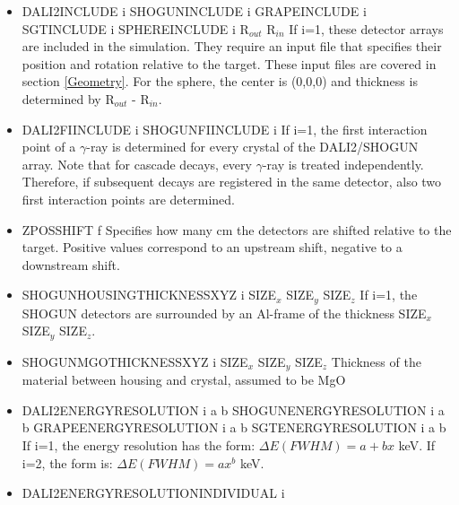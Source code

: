 \documentclass[12pt]{book}
\begin{document}
\begin{itemize}
\item DALI2INCLUDE i\hfill{} \linebreak
  SHOGUNINCLUDE i\hfill{} \linebreak
  GRAPEINCLUDE i\hfill{} \linebreak
  SGTINCLUDE i\hfill{} \linebreak
  SPHEREINCLUDE i R$_{out}$ R$_{in}$ \hfill{} \linebreak
  If i=1, these detector arrays are included in the simulation. They require an input file that 
  specifies their position and rotation relative to the target. These input files are covered in section
  \ref{Geometry}. For the sphere, the center is (0,0,0) and thickness is determined by R$_{out}$ - R$_{in}$. 
\item DALI2FIINCLUDE i\hfill{} \linebreak
  SHOGUNFIINCLUDE i\hfill{} \linebreak
  If i=1, the first interaction point of a $\gamma$-ray is determined for every crystal of the DALI2/SHOGUN array. Note that for
  cascade decays, every $\gamma$-ray is treated independently. Therefore, if subsequent decays are 
  registered in the same detector, also two first interaction points are determined.
\item ZPOSSHIFT f\hfill{} \linebreak
  Specifies how many cm the detectors are shifted relative to the target. Positive values correspond to an upstream
  shift, negative to a downstream shift.
\item SHOGUNHOUSINGTHICKNESSXYZ i SIZE$_{x}$ SIZE$_{y}$ SIZE$_{z}$\hfill{} \linebreak
  If i=1, the SHOGUN detectors are surrounded by an Al-frame of the thickness SIZE$_{x}$ SIZE$_{y}$ SIZE$_{z}$. 
\item SHOGUNMGOTHICKNESSXYZ i SIZE$_{x}$ SIZE$_{y}$ SIZE$_{z}$\hfill{} \linebreak
  Thickness of the material between housing and crystal, assumed to be MgO
\item DALI2ENERGYRESOLUTION i a b\hfill{} \linebreak
  SHOGUNENERGYRESOLUTION i a b\hfill{} \linebreak
  GRAPEENERGYRESOLUTION i a b\hfill{} \linebreak
  SGTENERGYRESOLUTION i a b\hfill{} \linebreak
  If i=1, the energy resolution has the form: $\Delta E (FWHM) = a + bx$ keV. If i=2, the form is: $\Delta E (FWHM) = ax^{b}$ keV.
\item DALI2ENERGYRESOLUTIONINDIVIDUAL i\hfill{} \linebreak

\end{itemize}
\end{document}
